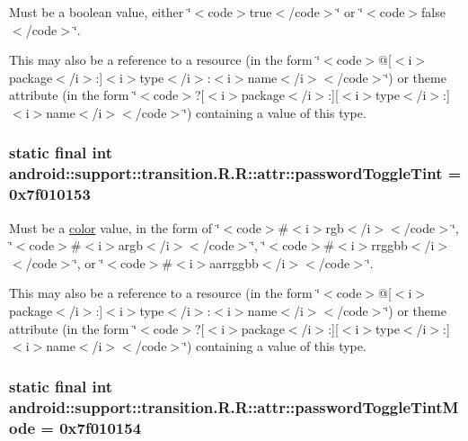 Must be a boolean value, either \char`\"{}$<$code$>$true$<$/code$>$\char`\"{} or \char`\"{}$<$code$>$false$<$/code$>$\char`\"{}. 

This may also be a reference to a resource (in the form \char`\"{}$<$code$>$@\mbox{[}$<$i$>$package$<$/i$>$:\mbox{]}$<$i$>$type$<$/i$>$:$<$i$>$name$<$/i$>$$<$/code$>$\char`\"{}) or theme attribute (in the form \char`\"{}$<$code$>$?\mbox{[}$<$i$>$package$<$/i$>$:\mbox{]}\mbox{[}$<$i$>$type$<$/i$>$:\mbox{]}$<$i$>$name$<$/i$>$$<$/code$>$\char`\"{}) containing a value of this type. \hypertarget{classandroid_1_1support_1_1transition_1_1_r_1_1attr_edd63f3a5497fc741935e881a2fb8b9f}{
\subsubsection[{passwordToggleTint}]{\setlength{\rightskip}{0pt plus 5cm}static final int android::support::transition.R.R::attr::passwordToggleTint = 0x7f010153}}
\label{classandroid_1_1support_1_1transition_1_1_r_1_1attr_edd63f3a5497fc741935e881a2fb8b9f}


Must be a \hyperlink{classandroid_1_1support_1_1transition_1_1_r_1_1color}{color} value, in the form of \char`\"{}$<$code$>$\#$<$i$>$rgb$<$/i$>$$<$/code$>$\char`\"{}, \char`\"{}$<$code$>$\#$<$i$>$argb$<$/i$>$$<$/code$>$\char`\"{}, \char`\"{}$<$code$>$\#$<$i$>$rrggbb$<$/i$>$$<$/code$>$\char`\"{}, or \char`\"{}$<$code$>$\#$<$i$>$aarrggbb$<$/i$>$$<$/code$>$\char`\"{}. 

This may also be a reference to a resource (in the form \char`\"{}$<$code$>$@\mbox{[}$<$i$>$package$<$/i$>$:\mbox{]}$<$i$>$type$<$/i$>$:$<$i$>$name$<$/i$>$$<$/code$>$\char`\"{}) or theme attribute (in the form \char`\"{}$<$code$>$?\mbox{[}$<$i$>$package$<$/i$>$:\mbox{]}\mbox{[}$<$i$>$type$<$/i$>$:\mbox{]}$<$i$>$name$<$/i$>$$<$/code$>$\char`\"{}) containing a value of this type. \hypertarget{classandroid_1_1support_1_1transition_1_1_r_1_1attr_7db8a88b28307f352156ced03c8084f4}{
\subsubsection[{passwordToggleTintMode}]{\setlength{\rightskip}{0pt plus 5cm}static final int android::support::transition.R.R::attr::passwordToggleTintMode = 0x7f010154}}
\label{classandroid_1_1support_1_1transition_1_1_r_1_1attr_7db8a88b28307f352156ced03c8084f4}


